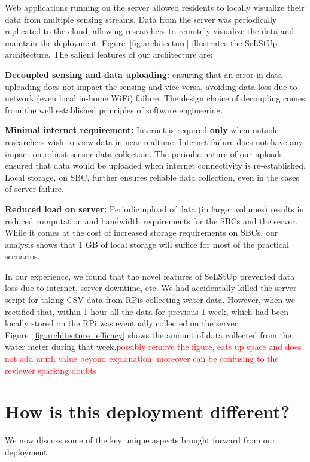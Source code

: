 \documentclass[10pt]{sensys-proc}
\newcommand{\redcolor}[1]{\textcolor{red}{#1}}
\newcommand{\figref}[1]{Figure~\ref{#1}}
\newcommand{\selstups}{SeLStUp }
\begin{document}
Web applications running on the server allowed residents to locally visualize their data from multiple sensing streams. Data from the server was periodically replicated to the cloud, allowing researchers to remotely visualize the data and maintain the deployment. \figref{fig:architecture} illustrates the \selstups architecture. The salient features of our architecture are:


\noindent \textbf{Decoupled sensing and data uploading:} ensuring that an error in data uploading does not impact the sensing and vice versa, avoiding data loss due to network (even local in-home WiFi) failure. The design choice of decoupling comes from the well established principles of software engineering.

\noindent \textbf{Minimal internet requirement:} Internet is required \textbf{only} when outside researchers wish to view data in near-realtime. Internet failure does not have any impact on robust sensor data collection. The periodic nature of our uploads ensured that data would be uploaded when internet connectivity is re-established. Local storage, on SBC, further ensures reliable data collection, even in the cases of server failure. %

\noindent \textbf{Reduced load on server:} Periodic upload of data (in larger volumes) results in reduced computation and bandwidth requirements for the SBCs and the server. While it comes at the cost of increased storage requirements on SBCs, our analysis shows that 1 GB of local storage will suffice for most of the practical scenarios. %

In our experience, we found that the novel features of \selstups prevented data loss due to internet, server downtime, etc. We had accidentally killed the server script for taking CSV data from RPis collecting water data. However, when we rectified that, within 1 hour all the data for previous 1 week, which had been locally stored on the RPi was eventually collected on the server. \figref{fig:architecture_efficacy} shows the amount of data collected from the water meter during that week.\redcolor{possibly remove the figure, eats up space and does not add much value beyond explanation; moreover can be confusing to the reviewer sparking doubts}


\vspace{-1mm}
\section{How is this deployment different?}
\label{sec:learning}
We now discuss some of the key unique aspects brought forward from our deployment. 
\end{document}
